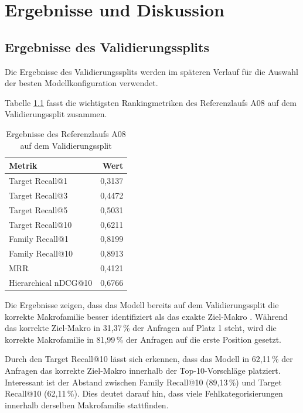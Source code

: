 \chapter{Ergebnisse und Diskussion}
\label{chap:ergebnisse_und_diskussion}

\section{Ergebnisse des Validierungssplits}

Die Ergebnisse des Validierungssplits werden im späteren Verlauf für die Auswahl der besten Modellkonfiguration verwendet.

Tabelle \ref{tab:validation_ergebnisse} fasst die wichtigsten Rankingmetriken des Referenzlaufs A08 auf dem Validierungssplit zusammen. 

\begin{table}[H] 
  \centering 
  \caption{Ergebnisse des Referenzlaufs A08 auf dem Validierungssplit} 
  \label{tab:validation_ergebnisse} 
  \begin{tabular}{lr} \toprule \textbf{Metrik} & \textbf{Wert} \\ 
    \midrule 
    Target Recall@1 & 0,3137 \\
    Target Recall@3 & 0,4472 \\
    Target Recall@5 & 0,5031 \\
    Target Recall@10 & 0,6211 \\
    Family Recall@1 & 0,8199 \\
    Family Recall@10 & 0,8913 \\
    MRR & 0,4121 \\
    Hierarchical nDCG@10 & 0,6766 \\
    \bottomrule 
  \end{tabular} 
\end{table}

Die Ergebnisse zeigen, dass das Modell bereits auf dem Validierungssplit die korrekte Makrofamilie besser identifiziert als das exakte Ziel-Makro \parencite{EPLAN-Makros}.
Während das korrekte Ziel-Makro \parencite{EPLAN-Makros} in 31,37\,\% der Anfragen auf Platz 1 steht, wird die korrekte Makrofamilie in 81,99\,\% der Anfragen auf die erste Position gesetzt.

Durch den Target Recall@10 lässt sich erkennen, dass das Modell in 62,11\,\% der Anfragen das korrekte Ziel-Makro \parencite{EPLAN-Makros} innerhalb der Top-10-Vorschläge platziert.
Interessant ist der Abstand zwischen Family Recall@10 (89,13\,\%) und Target Recall@10 (62,11\,\%). Dies deutet darauf hin, dass viele Fehlkategorisierungen innerhalb derselben Makrofamilie stattfinden.

